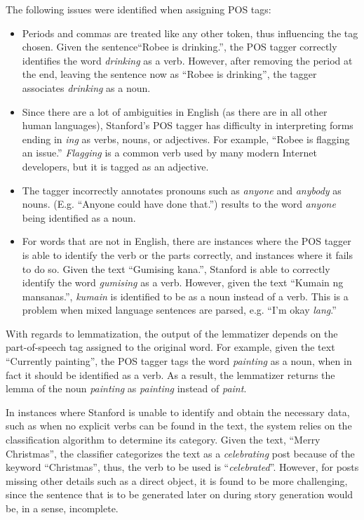 The following issues were identified when assigning POS tags:
\begin{itemize}
	\item Periods and commas are treated like any other token, thus influencing the tag chosen. Given the sentence``Robee is drinking.'', the POS tagger correctly identifies the word \textit{drinking} as a verb. However, after removing the period at the end, leaving the sentence now as ``Robee is drinking'', the tagger associates \textit{drinking} as a noun.
	\item Since there are a lot of ambiguities in English (as there are in all other human languages), Stanford's POS tagger has difficulty in interpreting forms ending in \textit{ing} as verbs, nouns, or adjectives. For example, ``Robee is flagging an issue.'' \textit{Flagging} is a common verb used by many modern Internet developers, but it is tagged as an adjective.
	\item The tagger incorrectly annotates pronouns such as \textit{anyone} and \textit{anybody} as nouns. (E.g. ``Anyone could have done that.'') results to the word \textit{anyone} being identified as a noun.
	\item For words that are not in English, there are instances where the POS tagger is able to identify the verb or the parts correctly, and instances where it fails to do so. Given the text ``Gumising kana.'', Stanford is able to correctly identify the word \textit{gumising} as a verb. However, given the text ``Kumain ng mansanas.'', \textit{kumain} is identified to be as a noun instead of a verb. This is a problem when mixed language sentences are parsed, e.g. ``I'm okay \textit{lang}.''
\end{itemize}

With regards to lemmatization, the output of the lemmatizer depends on the part-of-speech tag assigned to the original word. For example, given the text ``Currently painting'', the POS tagger tags the word \textit{painting} as a noun, when in fact it should be identified as a verb. As a result, the lemmatizer returns the lemma of the noun \textit{painting} as \textit{painting} instead of \textit{paint}.

In instances where Stanford is unable to identify and obtain the necessary data, such as when no explicit verbs can be found in the text, the system relies on the classification algorithm to determine its category. Given the text, ``Merry Christmas'', the classifier categorizes the text as a \textit{celebrating} post because of the keyword ``Christmas'', thus, the verb to be used is ``\textit{celebrated}''. However, for posts missing other details such as a direct object, it is found to be more challenging, since the sentence that is to be generated later on during story generation would be, in a sense, incomplete.
 
